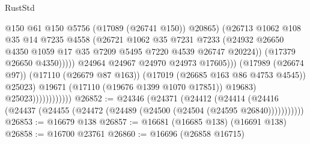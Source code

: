 \begin{lexlean}{RustStd}
\begin{coremodule}
                                              @150
                                              @61
                                              @150
                                              @5756
                                              (@17089 (@26741 @150))
                                              @20865)
                                            (@26713
                                              @1062
                                              @108
                                              @35
                                              @14
                                              @7235
                                              @4558
                                              (@26721
                                                @1062
                                                @35
                                                @7231
                                                @7233
                                                (@24932
                                                  @26650
                                                  @4350
                                                  @1059
                                                  @17
                                                  @35
                                                  @7209
                                                  @5495
                                                  @7220
                                                  @4539
                                                  @26747
                                                  @20224))
                                              (@17379 @26650 @4350)))))
                                      @24964
                                      @24967
                                      @24970
                                      @24973
                                      @17605)))
                                (@17989 (@26674 @97))
                                (@17110 (@26679 @87 @163))
                                (@17019 (@26685 @163 @86 @4753 @4545))
                                @25023)
                              @19671
                              (@17110 (@19676 @1399 @1070 @17851))
                              @19683)
                            @25023))))))))))))
@26852 := @24346
    (@24371
      (@24412
        (@24414 (@24416 (@24437 (@24455 (@24472 (@24489 (@24500 (@24504 (@24595 @26840)))))))))))
@26853 := @16679 @138
@26857 := @16681 (@16685 @138) (@16691 @138)
@26858 := @16700 @23761
@26860 := @16696 (@26858 @16715)

\end{coremodule}
\end{lexlean}

